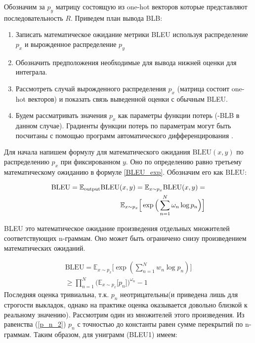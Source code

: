 \documentclass[14pt, a4paper]{extarticle}
\begin{document}
Обозначим за $p_y$ матрицу состоящую из one-hot векторов которые представляют последовательность $R$.
Приведем план вывода BLB:
\begin{enumerate}
  \item Записать математическое ожидание метрики BLEU используя распределение $p_x$ и вырожденное распределение $p_y$
  \item Обозначить предположения необходимые для вывода нижней оценки для интеграла.
  \item Рассмотреть случай вырожденного распределения $p_x$ (матрица состоит one-hot векторов) и показать связь выведенной оценки с обычным BLEU.
  \item Будем рассматривать значения $p_x$ как параметры функции потерь (-BLB в данном случае). Градиенты функции потерь по параметрам могут быть посчитаны с помощью программ автоматического дифференцирования \cite{pytorch}.
\end{enumerate}


Для начала напишем формулу для математического ожидания $\textrm{BLEU}(x, y)$ по распределению $p_x$ при фиксированном $y$. Оно по определению равно третьему математическому ожиданию в формуле \ref{BLEU_exp}. Обозначим его как $\textrm{BLEU}$:

\begin{equation}
\begin{split}
\textrm{BLEU} = \mathbb{E}_{\mathrm{output}} \textnormal{BLEU}(x, y) =\mathbb{E}_{x\sim p_x} \textrm{BLEU}(x, y) =\\
\mathbb{E}_{x\sim p_x} \Big \lbrack  \exp \Big(\sum_{n=1}^N \omega_n \log p_n \Big) \Big \rbrack
\label{gen_rbleu}
\end{split}
\end{equation}

BLEU это математическое ожидание произведения отдельных множителей соответствующих n-граммам. Оно может быть ограничено снизу произведением математических ожиданий.

\begin{equation}
\begin{split}
\textrm{BLEU} = \mathbb{E}_{x \sim p_x}  \Bigg \lbrack \exp\left(\sum\limits_{n=1}^N{w_n \log p_n} \right) \Bigg \rbrack \\
\geq  \prod_{n=1}^{N}  \big(\mathbb{E}_{x \sim p_x} \lbrack p_n \rbrack \big)^{\omega_n} - 1
\label{bleu_prod}
\end{split}
\end{equation}
Последняя оценка тривиальна, т.к. $p_n$ неотрицательны(и приведена лишь для строгости выкладок, однако на практике
оценка оказывается довольно близкой к реальному значению).
Рассмотрим один из множителей этого произведения. Из равенства (\ref{p_n_2})
$p_n$ с точностью до константы равен сумме перекрытий по n-граммам. Таким образом, для униграмм (BLEU1) имеем:
\end{document}
